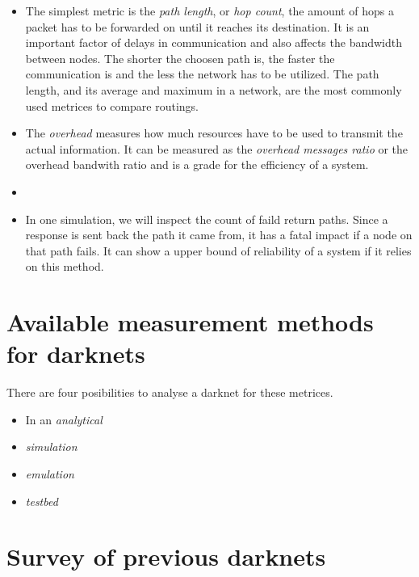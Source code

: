 \begin{itemize}
\item The simplest metric is the \emph{path length}, or \emph{hop count}, the amount of hops a packet has to be forwarded on until it reaches its destination. It is an important factor of delays in communication and also affects the bandwidth between nodes. The shorter the choosen path is, the faster the communication is and the less the network has to be utilized. The path length, and its average and maximum in a network, are the most commonly used metrices to compare routings.

\item The \emph{overhead} measures how much resources have to be used to transmit the actual information. It can be measured as the \emph{overhead messages ratio} or the overhead bandwith ratio and is a grade for the efficiency of a system.

\item 

\item In one simulation, we will inspect the count of faild return paths. Since a response is sent back the path it came from, it has a fatal impact if a node on that path fails. It can show a upper bound of reliability of a system if it relies on this method.
\end{itemize}

\section{Available measurement methods for darknets}

There are four posibilities to analyse a darknet for these metrices. 

\begin{itemize}
\item In an \emph{analytical} 

\item \emph{simulation}

\item \emph{emulation}

\item \emph{testbed}

\end{itemize}

\section{Survey of previous darknets}



